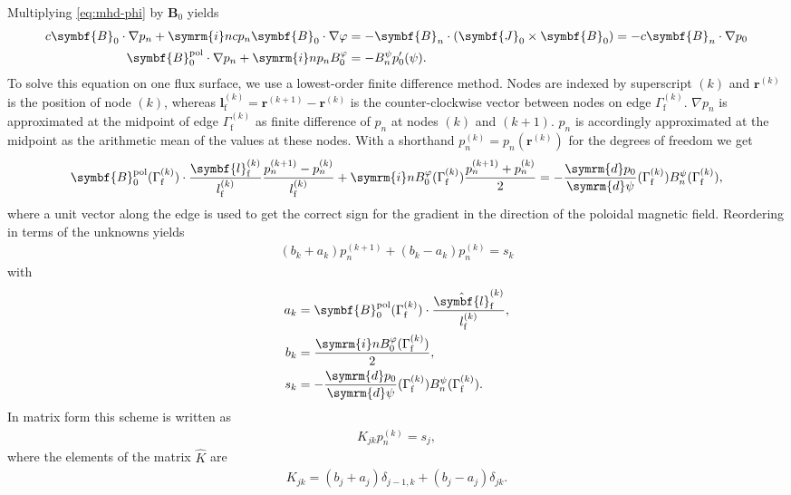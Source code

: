 \documentclass[a4paper, twoside, 10pt, english]{article}
\numberwithin{equation}{section}
\let\temp\varrho
\let\varrho\rho
\let\rho\temp
\let\temp\vartheta
\let\vartheta\theta
\let\theta\temp
\let\temp\varphi
\let\varphi\phi
\let\phi\temp
\let\vec\symbf
\newcommand*\grad{\ensuremath{\nabla}}
\newcommand*\diff{\ensuremath{\symrm{d}}}  %
\newcommand*\im{\ensuremath{\symrm{i}}}  %
\newcommand*\td[2][]{\ensuremath{\frac{\diff #1}{\diff #2}}}  %
\newcommand*\pol{\ensuremath{\textrm{pol}}}  %
\newcommand*\fs{\ensuremath{\textrm{f}}}  %
\begin{document}
Multiplying \cref{eq:mhd-phi} by $\vec{B}_{0}$ yields
\begin{align}
  c \vec{B}_{0} \cdot \grad p_{n} + \im n c p_{n} \vec{B}_{0} \cdot \grad \phi &= -\vec{B}_{n} \cdot (\vec{J}_{0} \times \vec{B}_{0}) = -c \vec{B}_{n} \cdot \grad p_{0} \nonumber \\
  \vec{B}_{0}^{\pol} \cdot \grad p_{n} + \im n p_{n} B_{0}^{\phi} &= -B_{n}^{\psi} p_{0}'(\psi). \label{eq:pn}
\end{align}
To solve this equation on one flux surface, we use a lowest-order finite difference method. Nodes are indexed by superscript $(k)$ and $\vec{r}^{(k)}$ is the position of node $(k)$, whereas $\vec{l}_{\fs}^{(k)} = \vec{r}^{(k+1)} - \vec{r}^{(k)}$ is the counter-clockwise vector between nodes on edge $\Gamma_{\fs}^{(k)}$. $\grad p_{n}$ is approximated at the midpoint of edge $\Gamma_{\fs}^{(k)}$ as finite difference of $p_{n}$ at nodes $(k)$ and $(k+1)$. $p_{n}$ is accordingly approximated at the midpoint as the arithmetic mean of the values at these nodes. With a shorthand $p_{n}^{(k)} = p_{n} (\vec{r}^{(k)})$ for the degrees of freedom we get
\begin{gather}
  \vec{B}_{0}^{\pol} (\Gamma_{\fs}^{(k)}) \cdot \frac{\vec{l}_{\fs}^{(k)}}{l_{\fs}^{(k)}} \frac{p_{n}^{(k+1)} - p_{n}^{(k)}}{l_{\fs}^{(k)}} + \im n B_{0}^{\phi} (\Gamma_{\fs}^{(k)}) \frac{p_{n}^{(k+1)} + p_{n}^{(k)}}{2} = -\td[p_{0}]{\psi} (\Gamma_{\fs}^{(k)}) B_{n}^{\psi} (\Gamma_{\fs}^{(k)}),
\end{gather}
where a unit vector along the edge is used to get the correct sign for the gradient in the direction of the poloidal magnetic field. Reordering in terms of the unknowns yields
\begin{gather}
  (b_{k} + a_{k}) p_{n}^{(k+1)} + (b_{k} - a_{k}) p_{n}^{(k)} = s_{k}
\end{gather}
with
\begin{align}
  a_{k} &= \vec{B}_{0}^{\pol} (\Gamma_{\fs}^{(k)}) \cdot \frac{\hat{\vec{l}}_{\fs}^{(k)}}{l_{\fs}^{(k)}}, \\
  b_{k} &= \frac{\im n B_{0}^{\phi} (\Gamma_{\fs}^{(k)})}{2}, \\
  s_{k} &= -\td[p_{0}]{\psi} (\Gamma_{\fs}^{(k)}) B_{n}^{\psi} (\Gamma_{\fs}^{(k)}).
\end{align}
In matrix form this scheme is written as
\begin{gather}
  K_{jk} p_{n}^{(k)} = s_{j},
\end{gather}
where the elements of the matrix $\hat{K}$ are
\begin{gather}
  K_{jk} = (b_{j} + a_{j}) \delta_{j-1, k} + (b_{j} - a_{j}) \delta_{jk}.
\end{gather}
\end{document}
